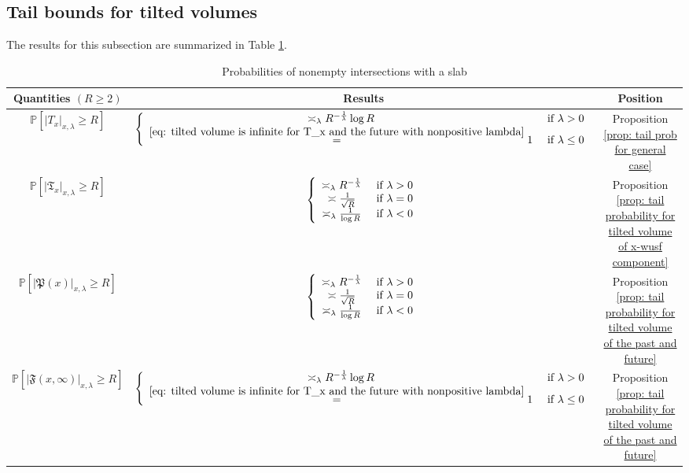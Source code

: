 \documentclass[12pt]{article}
\numberwithin{equation}{section}
\newcommand{\1}{\mathbf{1}}
\begin{document}
 \subsection{Tail bounds for tilted volumes}
The results for this subsection are summarized in Table \ref{table: tail probability for tilted volumes}.
 \begin{table}[!htbp]
	\centering
	\begin{tabular}{|c|c|c|}
		\hline
		Quantities $(R\geq 2)$ & Results & Position\\
		\hline
		$\mathbb{P}[|T_x|_{x,\lambda}\geq R]$ & $\left\{
		\begin{array}{cc}
		\asymp_\lambda R^{-\frac{1}{\lambda}}\log R & \textnormal{ if }\lambda>0\\
		\stackrel{\eqref{eq: tilted volume is infinite for T_x and the future with nonpositive lambda}}{=}1& \textnormal{ if }\lambda\leq 0\\
		\end{array}
		\right.$ & Proposition \ref{prop: tail prob for general case}\\
		\hline
		$\mathbb{P}[|\mathfrak{T}_x|_{x,\lambda}\geq R]$ & $\left\{
		\begin{array}{cc}
		\asymp_\lambda R^{-\frac{1}{\lambda}} & \textnormal{ if }\lambda>0\\
		\asymp \frac{1}{\sqrt{R}} & \textnormal{ if }\lambda=0\\
		\asymp_\lambda \frac{1}{\log R}& \textnormal{ if }\lambda <0\\
		\end{array}
		\right.$ & Proposition \ref{prop: tail probability for tilted volume of x-wusf component}\\
		\hline
		$\mathbb{P}[|\mathfrak{P}(x)|_{x,\lambda}\geq R]$ &  $\left\{
		\begin{array}{cc}
		\asymp_\lambda R^{-\frac{1}{\lambda}} & \textnormal{ if }\lambda>0\\
		\asymp \frac{1}{\sqrt{R}} & \textnormal{ if }\lambda=0\\
		\asymp_\lambda \frac{1}{\log R}& \textnormal{ if }\lambda <0\\
		\end{array}
		\right.$  & Proposition \ref{prop: tail probability for tilted volume of the past and future} \\
		\hline
		$\mathbb{P}[|\mathfrak{F}(x,\infty)|_{x,\lambda}\geq R]$ &  $\left\{
		\begin{array}{cc}
		\asymp_\lambda R^{-\frac{1}{\lambda}}\log R & \textnormal{ if }\lambda>0\\
		\stackrel{\eqref{eq: tilted volume is infinite for T_x and the future with nonpositive lambda}}{=}1& \textnormal{ if }\lambda\leq 0\\
		\end{array}
		\right.$& Proposition \ref{prop: tail probability for tilted volume of the past and future}\\
		\hline
	\end{tabular}
\centering
	\caption{Probabilities of nonempty intersections with a slab}
	\label{table: tail probability for tilted volumes}
\end{table}
\end{document}
